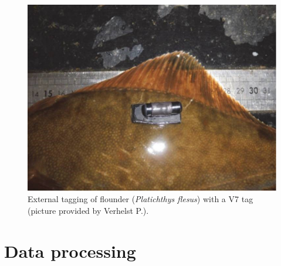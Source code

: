 \begin{figure}[h!]
  \centering\includegraphics[scale=0.57]{Floundertagged}
  \caption{External tagging of flounder (\textit{Platichthys flesus}) with a V7 tag (picture provided by Verhelst P.).}
  \label{fig:Floundertagged}
\end{figure}

\clearpage

\section{Data processing}
\label{Dataprocessing}
\FloatBarrier

\setcounter{table}{0} \renewcommand{\thetable}{B.\arabic{table}}
\setcounter{figure}{0} \renewcommand{\thefigure}{B.\arabic{figure}}

